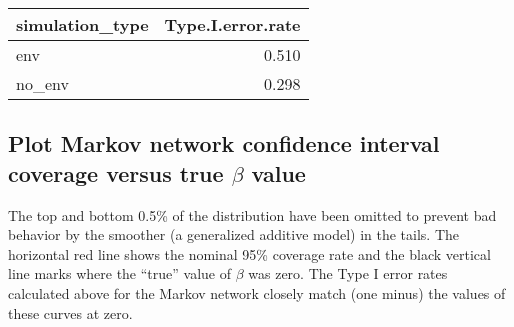 \documentclass[11pt,]{article}
\newenvironment{Shaded}{\begin{snugshade}}{\end{snugshade}}
\newcommand{\KeywordTok}[1]{\textcolor[rgb]{0.13,0.29,0.53}{\textbf{{#1}}}}
\newcommand{\DataTypeTok}[1]{\textcolor[rgb]{0.13,0.29,0.53}{{#1}}}
\newcommand{\DecValTok}[1]{\textcolor[rgb]{0.00,0.00,0.81}{{#1}}}
\newcommand{\StringTok}[1]{\textcolor[rgb]{0.31,0.60,0.02}{{#1}}}
\newcommand{\NormalTok}[1]{{#1}}
\begin{document}
\begin{Shaded}
\end{Shaded}

\begin{longtable}[c]{@{}lr@{}}
\toprule
simulation\_type & Type.I.error.rate\tabularnewline
\midrule
\endhead
env & 0.510\tabularnewline
no\_env & 0.298\tabularnewline
\bottomrule
\end{longtable}

\subsection{\texorpdfstring{Plot Markov network confidence interval
coverage versus true \(\beta\)
value}{Plot Markov network confidence interval coverage versus true \textbackslash{}beta value}}\label{plot-markov-network-confidence-interval-coverage-versus-true-beta-value}

The top and bottom 0.5\% of the distribution have been omitted to
prevent bad behavior by the smoother (a generalized additive model) in
the tails. The horizontal red line shows the nominal 95\% coverage rate
and the black vertical line marks where the ``true'' value of \(\beta\)
was zero. The Type I error rates calculated above for the Markov network
closely match (one minus) the values of these curves at zero.
\end{document}
